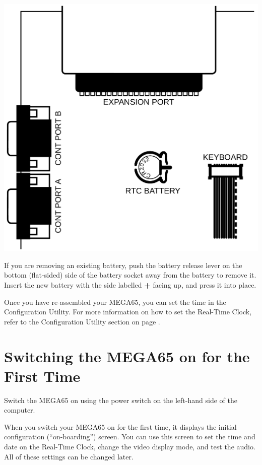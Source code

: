\includegraphics[width=\linewidth]{images/illustrations/rtc-battery-location.pdf}

If you are removing an existing battery, push the battery release lever on the bottom (flat-sided) side of the battery socket away from the battery to remove it. Insert the new battery with the side labelled {\bf +} facing up, and press it into place.

Once you have re-assembled your MEGA65, you can set the time in the Configuration Utility. For more information on how to set the Real-Time Clock, refer to the Configuration Utility section on page \pageref{sec:configuration-utility}.


\newpage

\section{Switching the MEGA65 on for the First Time}
\label{onboarding}

Switch the MEGA65 on using the power switch on the left-hand side of the computer.

When you switch your MEGA65 on for the first time, it displays the initial configuration (``on-boarding'') screen. You can use this screen to set the time and date on the Real-Time Clock, change the video display mode, and test the audio. All of these settings can be changed later.

